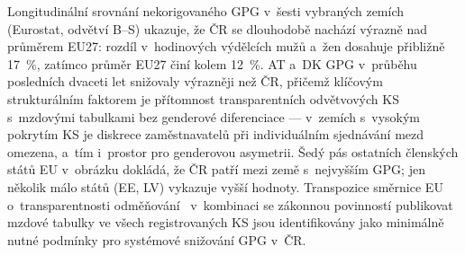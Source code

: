 Longitudinální srovnání nekorigovaného \ac{GPG} v~šesti vybraných zemích (Eurostat, odvětví B--S) ukazuje, že ČR se dlouhodobě nachází výrazně nad průměrem \ac{EU}27: rozdíl v~hodinových výdělcích mužů a~žen dosahuje přibližně \SI{17}{\percent}, zatímco průměr \ac{EU}27 činí kolem \SI{12}{\percent}.
AT a~DK \ac{GPG} v~průběhu posledních dvaceti let snižovaly výrazněji než ČR, přičemž klíčovým strukturálním faktorem je přítomnost transparentních odvětvových \ac{KS} s~mzdovými tabulkami bez genderové diferenciace --- v~zemích s~vysokým pokrytím \ac{KS} je diskrece zaměstnavatelů při individuálním sjednávání mezd omezena, a~tím i~prostor pro genderovou asymetrii.
Šedý pás ostatních členských států \ac{EU} v~obrázku dokládá, že ČR patří mezi země s~nejvyšším \ac{GPG}; jen několik málo států (EE, LV) vykazuje vyšší hodnoty.
Transpozice směrnice \ac{EU} o~transparentnosti odměňování~\cite{smernice_pay_transparency_2023} v~kombinaci se zákonnou povinností publikovat mzdové tabulky ve všech registrovaných \ac{KS} jsou identifikovány jako minimálně nutné podmínky pro systémové snižování \ac{GPG} v~ČR.



